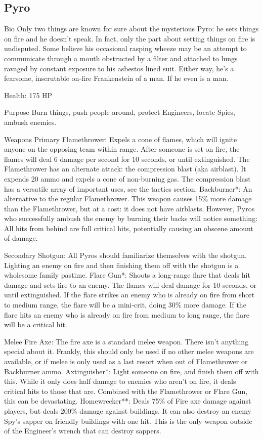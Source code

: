 \subsection{Pyro}
Bio
Only two things are known for sure about the mysterious Pyro: he sets things on fire and he doesn't speak. In fact, only the part about setting things on fire is undisputed. Some believe his occasional rasping wheeze may be an attempt to communicate through a mouth obstructed by a filter and attached to lungs ravaged by constant exposure to his asbestos lined suit. Either way, he's a fearsome, inscrutable on-fire Frankenstein of a man. If he even is a man.

Health: 175 HP

Purpose
Burn things, push people around, protect Engineers, locate Spies, ambush enemies.

Weapons
Primary
Flamethrower: Expels a cone of flames, which will ignite anyone on the opposing team within range. After someone is set on fire, the flames will deal 6 damage per second for 10 seconds, or until extinguished. The Flamethrower has an alternate attack: the compression blast (aka airblast). It expends 20 ammo and expels a cone of non-burning gas. The compression blast has a versatile array of important uses, see the tactics section.
Backburner*:  An alternative to the regular Flamethrower. This weapon causes 15\% more damage than the Flamethrower, but at a cost: it does not have airblasts. However, Pyros who successfully ambush the enemy by burning their backs will notice something:  All hits from behind are full critical hits, potentially causing an obscene amount of damage. 

Secondary
Shotgun: All Pyros should familiarize themselves with the shotgun. Lighting an enemy on fire and then finishing them off with the shotgun is a wholesome family pastime.
Flare Gun*: Shoots a long-range flare that deals hit damage and sets fire to an enemy. The flames will deal damage for 10 seconds, or until extinguished. If the flare strikes an enemy who is already on fire from short to medium range, the flare will be a mini-crit, doing 30\% more damage. If the flare hits an enemy who is already on fire from medium to long range, the flare will be a critical hit.

Melee
Fire Axe: The fire axe is a standard melee weapon.  There isn't anything special about it.  Frankly, this should only be used if no other melee weapons are available, or if melee is only used as a last resort when out of Flamethrower or Backburner ammo.
Axtinguisher*: Light someone on fire, and finish them off with this.  While it only does half damage to enemies who aren't on fire, it deals critical hits to those that are.  Combined with the Flamethrower or Flare Gun, this can be devastating. 
Homewrecker**: Deals 75\% of Fire axe damage against players, but deals 200\% damage against buildings.  It can also destroy an enemy Spy's sapper on friendly buildings with one hit.  This is the only weapon outside of the Engineer's wrench that can destroy sappers.


